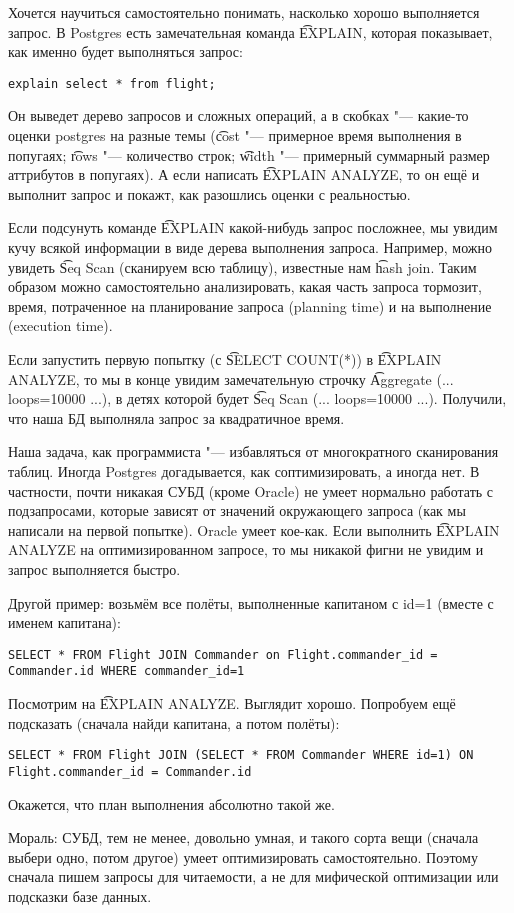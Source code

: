 	Хочется научиться самостоятельно понимать, насколько хорошо выполняется запрос.
	В Postgres есть замечательная команда \t{EXPLAIN}, которая показывает, как именно будет выполняться запрос:
\begin{verbatim}
explain select * from flight;
\end{verbatim}
	Он выведет дерево запросов и сложных операций, а в скобках "--- какие-то оценки postgres на разные темы
	(\t{cost} "--- примерное время выполнения в попугаях; \t{rows} "--- количество строк; \t{width} "--- примерный суммарный размер аттрибутов в попугаях).
	А если написать \t{EXPLAIN ANALYZE}, то он ещё и выполнит запрос и покажт, как разошлись оценки с реальностью.

	Если подсунуть команде \t{EXPLAIN} какой-нибудь запрос посложнее, мы увидим кучу всякой информации
	в виде дерева выполнения запроса.
	Например, можно увидеть \t{Seq Scan} (сканируем всю таблицу), известные нам \t{hash join}.
	Таким образом можно самостоятельно анализировать, какая часть запроса тормозит,
	время, потраченное на планирование запроса (planning time) и на выполнение (execution time).

	Если запустить первую попытку (с \t{SELECT COUNT(*)}) в \t{EXPLAIN ANALYZE}, то
	мы в конце увидим замечательную строчку \t{Aggregate (... loops=10000 ...)}, в детях которой
	будет \t{Seq Scan (... loops=10000 ...)}.
	Получили, что наша БД выполняла запрос за квадратичное время.
	
	Наша задача, как программиста "--- избавляться от многократного сканирования таблиц.
	Иногда Postgres догадывается, как соптимизировать, а иногда нет.
	В частности, почти никакая СУБД (кроме Oracle) не умеет нормально работать с подзапросами,
	которые зависят от значений окружающего запроса (как мы написали на первой попытке).
	Oracle умеет кое-как.
	Если выполнить \t{EXPLAIN ANALYZE} на оптимизированном запросе, то мы никакой фигни не увидим и
	запрос выполняется быстро.

	Другой пример: возьмём все полёты, выполненные капитаном с id=1 (вместе с именем капитана):
\begin{verbatim}
SELECT * FROM Flight JOIN Commander on Flight.commander_id = Commander.id WHERE commander_id=1
\end{verbatim}
	Посмотрим на \t{EXPLAIN ANALYZE}.
	Выглядит хорошо.
	Попробуем ещё подсказать (сначала найди капитана, а потом полёты):
\begin{verbatim}
SELECT * FROM Flight JOIN (SELECT * FROM Commander WHERE id=1) ON Flight.commander_id = Commander.id
\end{verbatim}
	Окажется, что план выполнения абсолютно такой же.

	Мораль: СУБД, тем не менее, довольно умная, и такого сорта вещи (сначала выбери одно, потом другое)
	умеет оптимизировать самостоятельно.
	Поэтому сначала пишем запросы для читаемости, а не для мифической оптимизации или подсказки базе данных.
